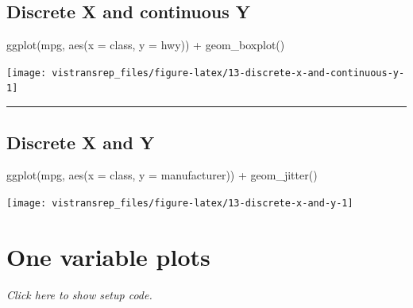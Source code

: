 \documentclass[]{book}
\newenvironment{Shaded}{}{}
\newcommand{\DataTypeTok}[1]{#1}
\newcommand{\KeywordTok}[1]{\textcolor[rgb]{0.00,0.00,1.00}{#1}}
\newcommand{\NormalTok}[1]{#1}
\newcommand{\OperatorTok}[1]{#1}
\newcommand{\StringTok}[1]{\textcolor[rgb]{0.00,0.50,0.50}{#1}}
\begin{document}
\hypertarget{discrete-x-and-continuous-y}{%
\subsection{Discrete X and continuous Y}\label{discrete-x-and-continuous-y}}

\begin{Shaded}
\begin{Highlighting}[]
\KeywordTok{ggplot}\NormalTok{(mpg, }\KeywordTok{aes}\NormalTok{(}\DataTypeTok{x =}\NormalTok{ class, }\DataTypeTok{y =}\NormalTok{ hwy)) }\OperatorTok{+}
\StringTok{  }\KeywordTok{geom_boxplot}\NormalTok{()}
\end{Highlighting}
\end{Shaded}

\begin{flushright}\texttt{[image: vistransrep\_files/figure-latex/13-discrete-x-and-continuous-y-1]} \end{flushright}

\begin{center}\rule{0.5\linewidth}{\linethickness}\end{center}

\hypertarget{discrete-x-and-y}{%
\subsection{Discrete X and Y}\label{discrete-x-and-y}}

\begin{Shaded}
\begin{Highlighting}[]
\KeywordTok{ggplot}\NormalTok{(mpg, }\KeywordTok{aes}\NormalTok{(}\DataTypeTok{x =}\NormalTok{ class, }\DataTypeTok{y =}\NormalTok{ manufacturer)) }\OperatorTok{+}
\StringTok{  }\KeywordTok{geom_jitter}\NormalTok{()}
\end{Highlighting}
\end{Shaded}

\begin{flushright}\texttt{[image: vistransrep\_files/figure-latex/13-discrete-x-and-y-1]} \end{flushright}

\hypertarget{one-variable-plots}{%
\section{One variable plots}\label{one-variable-plots}}

\emph{Click here to show setup code.}
\end{document}
